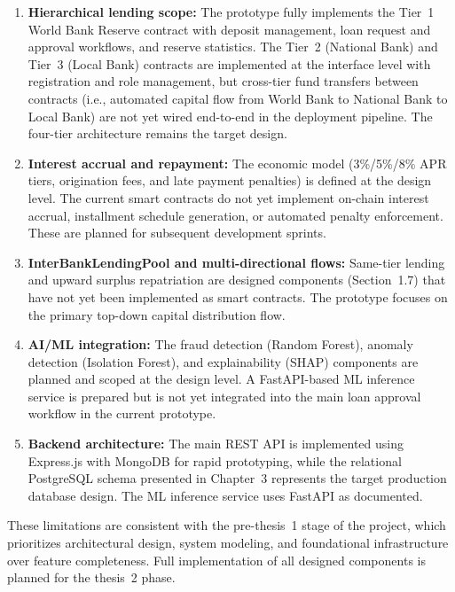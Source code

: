 \documentclass[12pt,a4paper]{report}
\begin{document}
\begin{enumerate}[noitemsep]
\item \textbf{Hierarchical lending scope:} The prototype fully implements the Tier~1 World Bank Reserve contract with deposit management, loan request and approval workflows, and reserve statistics. The Tier~2 (National Bank) and Tier~3 (Local Bank) contracts are implemented at the interface level with registration and role management, but cross-tier fund transfers between contracts (i.e., automated capital flow from World Bank to National Bank to Local Bank) are not yet wired end-to-end in the deployment pipeline. The four-tier architecture remains the target design.

\item \textbf{Interest accrual and repayment:} The economic model (3\%/5\%/8\% APR tiers, origination fees, and late payment penalties) is defined at the design level. The current smart contracts do not yet implement on-chain interest accrual, installment schedule generation, or automated penalty enforcement. These are planned for subsequent development sprints.

\item \textbf{InterBankLendingPool and multi-directional flows:} Same-tier lending and upward surplus repatriation are designed components (Section~1.7) that have not yet been implemented as smart contracts. The prototype focuses on the primary top-down capital distribution flow.

\item \textbf{AI/ML integration:} The fraud detection (Random Forest), anomaly detection (Isolation Forest), and explainability (SHAP) components are planned and scoped at the design level. A FastAPI-based ML inference service is prepared but is not yet integrated into the main loan approval workflow in the current prototype.

\item \textbf{Backend architecture:} The main REST API is implemented using Express.js with MongoDB for rapid prototyping, while the relational PostgreSQL schema presented in Chapter~3 represents the target production database design. The ML inference service uses FastAPI as documented.
\end{enumerate}

These limitations are consistent with the pre-thesis~1 stage of the project, which prioritizes architectural design, system modeling, and foundational infrastructure over feature completeness. Full implementation of all designed components is planned for the thesis~2 phase.
\end{document}
